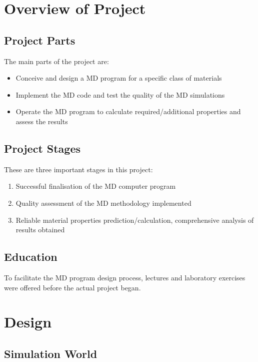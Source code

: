 \documentclass[12pt,a4paper]{article}
\begin{document}
\newpage
\section{Overview of Project}
\label{sec:Overview}

\subsection{Project Parts}
The main parts of the project are:
\begin{itemize}
\item Conceive and design a MD program for a specific class of materials
\item Implement the MD code and test the quality of the MD simulations
\item Operate the MD program to calculate required/additional properties and assess the results
\end{itemize}

\subsection{Project Stages}
These are three important stages in this project:
\begin{enumerate}
\item Successful finalisation of the MD computer program
\item Quality assessment of the MD methodology implemented
\item Reliable material properties prediction/calculation, comprehensive analysis of results obtained
\end{enumerate}

\subsection{Education}
To facilitate the MD program design process, lectures and laboratory exercises were offered before the actual project began.

\newpage
\section{Design}

\subsection{Simulation World}
\end{document}
